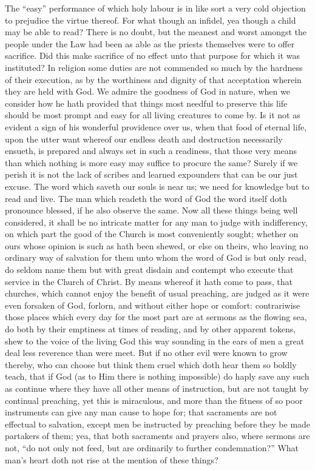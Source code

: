 The “easy” performance of which holy labour is in like sort a very cold objection to prejudice the virtue thereof. For what though an infidel, yea though a child may be able to read? There is no doubt, but the meanest and worst amongst the people under the Law had been as able as the priests themselves were to offer sacrifice. Did this make sacrifice of no effect unto that purpose for which it was instituted? In religion some duties are not commended so much by the hardness of their execution, as by the worthiness and dignity of that acceptation wherein they are held with God.
We admire the goodness of God in nature, when we consider how he hath provided that things most needful to preserve this life should be most prompt and easy for all living creatures to come by. Is it not as evident a sign of his wonderful providence over us, when that food of eternal life, upon the utter want whereof our endless death and destruction necessarily ensueth, is prepared and always set in such a readiness, that those very means than which nothing is more easy may suffice to procure the same? Surely if we perish it is not the lack of scribes and learned expounders that can be our just excuse. The word which saveth our souls is near us; we need for knowledge but to read and live. The man which readeth the word of God the word itself doth pronounce blessed, if he also observe the same.
Now all these things being well considered, it shall be no intricate matter for any man to judge with indifferency, on which part the good of the Church is most conveniently sought; whether on ours whose opinion is such as hath been shewed, or else on theirs, who leaving no ordinary way of  salvation for them unto whom the word of God is but only read, do seldom name them but with great disdain and contempt who execute that service in the Church of Christ. By means whereof it hath come to pass, that churches, which cannot enjoy the benefit of usual preaching, are judged as it were even forsaken of God, forlorn, and without either hope or comfort: contrariwise those places which every day for the most part are at sermons as the flowing sea, do both by their emptiness at times of reading, and by other apparent tokens, shew to the voice of the living God this way sounding in the ears of men a great deal less reverence than were meet.
But if no other evil were known to grow thereby, who can choose but think them cruel which doth hear them so boldly teach, that if God (as to Him there is nothing impossible) do haply save any such as continue where they have all other means of instruction, but are not taught by continual preaching, yet this is miraculous, and more than the fitness of so poor instruments can give any man cause to hope for; that sacraments are not effectual to salvation, except men be instructed by preaching before they be made partakers of them; yea, that both sacraments and prayers also, where sermons are not, “do not only not feed, but are ordinarily to  further condemnation?” What man’s heart doth not rise at the mention of these things?
